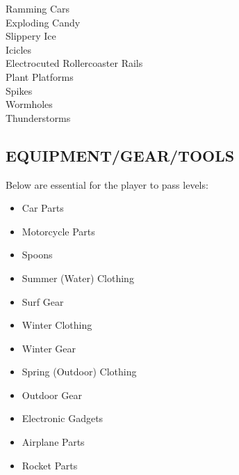 \documentclass[11pt]{article}
\begin{document}
	\begin{multicols}{3}
		\begin{center}
			Ramming Cars \\
			Exploding Candy \\
			Slippery Ice \\\columnbreak
			Icicles \\
			Electrocuted Rollercoaster Rails \\
			Plant Platforms \\\columnbreak
			Spikes  \\
			Wormholes \\
			Thunderstorms
		\end{center}
	\end{multicols}
	\subsection*{EQUIPMENT/GEAR/TOOLS}
	Below are essential for the player to pass levels:
	\begin{itemize}[noitemsep]
		\item Car Parts
		\item Motorcycle Parts
		\item Spoons
		\item Summer (Water) Clothing
		\item Surf Gear
		\item Winter Clothing
		\item Winter Gear
		\item Spring (Outdoor) Clothing
		\item Outdoor Gear
		\item Electronic Gadgets
		\item Airplane Parts
		\item Rocket Parts
	\end{itemize}
\end{document}
